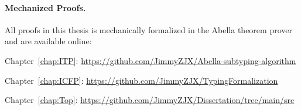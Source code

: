 \paragraph{Mechanized Proofs.}
All proofs in this thesis is mechanically formalized in the Abella theorem prover
and are available online:
\begin{sloppypar}
\begin{description}
  \item Chapter~\ref{chap:ITP}: \url{https://github.com/JimmyZJX/Abella-subtyping-algorithm}
  \item Chapter~\ref{chap:ICFP}: \url{https://github.com/JimmyZJX/TypingFormalization}
  \item Chapter~\ref{chap:Top}: \url{https://github.com/JimmyZJX/Dissertation/tree/main/src}
\end{description}
\end{sloppypar}

\noindent\makebox[\linewidth]{\rule{0.7\textwidth}{0.4pt}}

\vspace{1.5\baselineskip}



